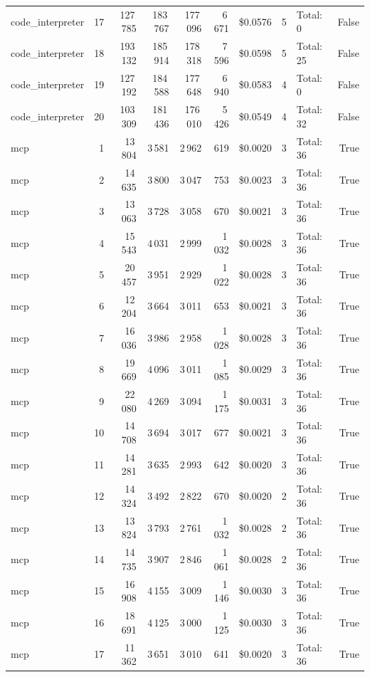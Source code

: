 \documentclass[a4paper,11pt]{article}
\begin{document}
\begin{table}[H]
{\begin{tabular}{l r r r r r r r l r}
code\_interpreter & 17 & 127\,785 & 183\,767 & 177\,096 & 6\,671 & \$0.0576 & 5 & Total: 0 & False \\
code\_interpreter & 18 & 193\,132 & 185\,914 & 178\,318 & 7\,596 & \$0.0598 & 5 & Total: 25 & False \\
code\_interpreter & 19 & 127\,192 & 184\,588 & 177\,648 & 6\,940 & \$0.0583 & 4 & Total: 0 & False \\
code\_interpreter & 20 & 103\,309 & 181\,436 & 176\,010 & 5\,426 & \$0.0549 & 4 & Total: 32 & False \\
\midrule
mcp & 1 & 13\,804 & 3\,581 & 2\,962 & 619 & \$0.0020 & 3 & Total: 36 & True \\
mcp & 2 & 14\,635 & 3\,800 & 3\,047 & 753 & \$0.0023 & 3 & Total: 36 & True \\
mcp & 3 & 13\,063 & 3\,728 & 3\,058 & 670 & \$0.0021 & 3 & Total: 36 & True \\
mcp & 4 & 15\,543 & 4\,031 & 2\,999 & 1\,032 & \$0.0028 & 3 & Total: 36 & True \\
mcp & 5 & 20\,457 & 3\,951 & 2\,929 & 1\,022 & \$0.0028 & 3 & Total: 36 & True \\
mcp & 6 & 12\,204 & 3\,664 & 3\,011 & 653 & \$0.0021 & 3 & Total: 36 & True \\
mcp & 7 & 16\,036 & 3\,986 & 2\,958 & 1\,028 & \$0.0028 & 3 & Total: 36 & True \\
mcp & 8 & 19\,669 & 4\,096 & 3\,011 & 1\,085 & \$0.0029 & 3 & Total: 36 & True \\
mcp & 9 & 22\,080 & 4\,269 & 3\,094 & 1\,175 & \$0.0031 & 3 & Total: 36 & True \\
mcp & 10 & 14\,708 & 3\,694 & 3\,017 & 677 & \$0.0021 & 3 & Total: 36 & True \\
mcp & 11 & 14\,281 & 3\,635 & 2\,993 & 642 & \$0.0020 & 3 & Total: 36 & True \\
mcp & 12 & 14\,324 & 3\,492 & 2\,822 & 670 & \$0.0020 & 2 & Total: 36 & True \\
mcp & 13 & 13\,824 & 3\,793 & 2\,761 & 1\,032 & \$0.0028 & 2 & Total: 36 & True \\
mcp & 14 & 14\,735 & 3\,907 & 2\,846 & 1\,061 & \$0.0028 & 2 & Total: 36 & True \\
mcp & 15 & 16\,908 & 4\,155 & 3\,009 & 1\,146 & \$0.0030 & 3 & Total: 36 & True \\
mcp & 16 & 18\,691 & 4\,125 & 3\,000 & 1\,125 & \$0.0030 & 3 & Total: 36 & True \\
mcp & 17 & 11\,362 & 3\,651 & 3\,010 & 641 & \$0.0020 & 3 & Total: 36 & True \\

\end{tabular}}
\end{table}
\end{document}
